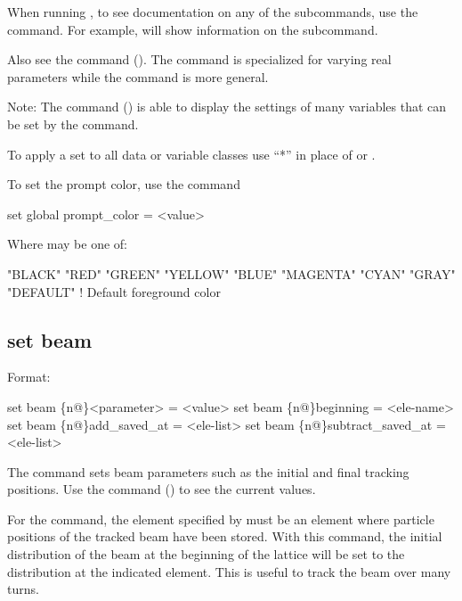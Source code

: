 {{\vskip 10pt 

When running \tao, to see documentation on any of the subcommands, use the  command. For example,  will show information on the  subcommand.

Also see the  command (). The  command is specialized for
varying real parameters while the  command is more general.

Note: The  command () is able to display the settings of many variables that
can be set by the  command.

To apply a set to all data or variable classes use ``*'' in place of  or .

To set the prompt color, use the command
\begin{example}
  set global prompt_color = <value>
\end{example}
Where  may be one of:
\begin{example}
  "BLACK"
  "RED"
  "GREEN"
  "YELLOW"
  "BLUE"
  "MAGENTA"
  "CYAN"
  "GRAY"
  "DEFAULT"       ! Default foreground color
\end{example}



\subsection{set beam}
\label{s:set.beam}

Format:
\begin{example}
  set beam \{n@\}<parameter> = <value>
  set beam \{n@\}beginning = <ele-name>
  set beam \{n@\}add_saved_at = <ele-list>
  set beam \{n@\}subtract_saved_at = <ele-list>
\end{example}

The  command sets beam parameters such as the initial and final tracking positions.
Use the  command () to see the current values.

For the  command, the element specified by  must be
an element where particle positions of the tracked beam have been stored. With this command, the
initial distribution of the beam at the beginning of the lattice will be set to the distribution at
the indicated element. This is useful to track the beam over many turns.

}}
